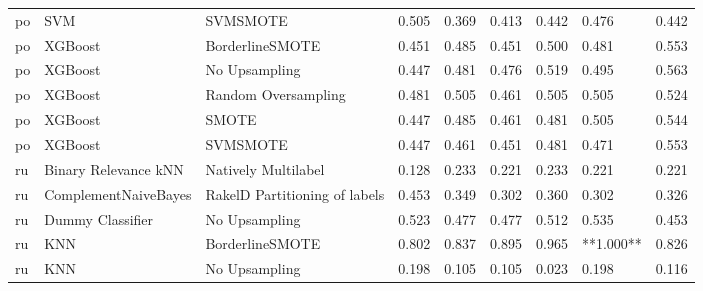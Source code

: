 \begin{tabular}{lllllllll}
      po &                             SVM &                      SVMSMOTE & 0.505 &                     0.369 &                 0.413 &                  0.442 &                                   0.476 &     0.442 \\
      po &                         XGBoost &               BorderlineSMOTE & 0.451 &                     0.485 &                 0.451 &                  0.500 &                                   0.481 &     0.553 \\
      po &                         XGBoost &                 No Upsampling & 0.447 &                     0.481 &                 0.476 &                  0.519 &                                   0.495 &     0.563 \\
      po &                         XGBoost &           Random Oversampling & 0.481 &                     0.505 &                 0.461 &                  0.505 &                                   0.505 &     0.524 \\
      po &                         XGBoost &                         SMOTE & 0.447 &                     0.485 &                 0.461 &                  0.481 &                                   0.505 &     0.544 \\
      po &                         XGBoost &                      SVMSMOTE & 0.447 &                     0.461 &                 0.451 &                  0.481 &                                   0.471 &     0.553 \\
      ru &            Binary Relevance kNN &           Natively Multilabel & 0.128 &                     0.233 &                 0.221 &                  0.233 &                                   0.221 &     0.221 \\
      ru &            ComplementNaiveBayes & RakelD Partitioning of labels & 0.453 &                     0.349 &                 0.302 &                  0.360 &                                   0.302 &     0.326 \\
      ru &                Dummy Classifier &                 No Upsampling & 0.523 &                     0.477 &                 0.477 &                  0.512 &                                   0.535 &     0.453 \\
      ru &                             KNN &               BorderlineSMOTE & 0.802 &                     0.837 &                 0.895 &                  0.965 &                               **1.000** &     0.826 \\
      ru &                             KNN &                 No Upsampling & 0.198 &                     0.105 &                 0.105 &                  0.023 &                                   0.198 &     0.116 \\

\end{tabular}
